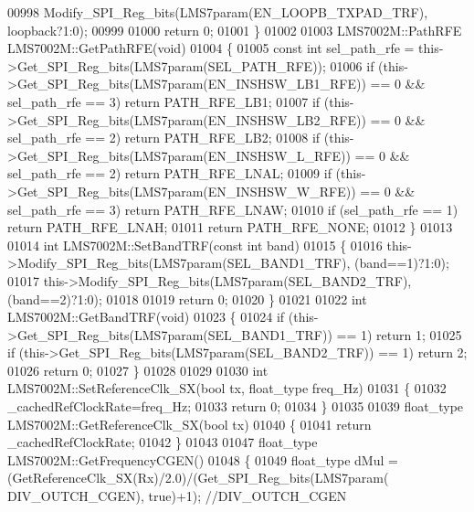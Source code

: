 \begin{DoxyCode}
{{{{{{{{{{{{{{{{{{{{{{{{{00998     Modify_SPI_Reg_bits(LMS7param(EN_LOOPB_TXPAD_TRF), loopback?1:0);
00999 
01000     \textcolor{keywordflow}{return} 0;
01001 \}
01002 
01003 LMS7002M::PathRFE LMS7002M::GetPathRFE(\textcolor{keywordtype}{void})
01004 \{
01005     \textcolor{keyword}{const} \textcolor{keywordtype}{int} sel\_path\_rfe = this->Get_SPI_Reg_bits(LMS7param(SEL_PATH_RFE));
01006     \textcolor{keywordflow}{if} (this->Get_SPI_Reg_bits(LMS7param(EN_INSHSW_LB1_RFE)) == 0 && sel\_path\_rfe == 3) \textcolor{keywordflow}{return} 
      PATH_RFE_LB1;
01007     \textcolor{keywordflow}{if} (this->Get_SPI_Reg_bits(LMS7param(EN_INSHSW_LB2_RFE)) == 0 && sel\_path\_rfe == 2) \textcolor{keywordflow}{return} 
      PATH_RFE_LB2;
01008     \textcolor{keywordflow}{if} (this->Get_SPI_Reg_bits(LMS7param(EN_INSHSW_L_RFE)) == 0 && sel\_path\_rfe == 2) \textcolor{keywordflow}{return} 
      PATH_RFE_LNAL;
01009     \textcolor{keywordflow}{if} (this->Get_SPI_Reg_bits(LMS7param(EN_INSHSW_W_RFE)) == 0 && sel\_path\_rfe == 3) \textcolor{keywordflow}{return} 
      PATH_RFE_LNAW;
01010     \textcolor{keywordflow}{if} (sel\_path\_rfe == 1) \textcolor{keywordflow}{return} PATH_RFE_LNAH;
01011     \textcolor{keywordflow}{return} PATH_RFE_NONE;
01012 \}
01013 
01014 \textcolor{keywordtype}{int} LMS7002M::SetBandTRF(\textcolor{keyword}{const} \textcolor{keywordtype}{int} band)
01015 \{
01016     this->Modify_SPI_Reg_bits(LMS7param(SEL_BAND1_TRF), (band==1)?1:0);
01017     this->Modify_SPI_Reg_bits(LMS7param(SEL_BAND2_TRF), (band==2)?1:0);
01018 
01019     \textcolor{keywordflow}{return} 0;
01020 \}
01021 
01022 \textcolor{keywordtype}{int} LMS7002M::GetBandTRF(\textcolor{keywordtype}{void})
01023 \{
01024     \textcolor{keywordflow}{if} (this->Get_SPI_Reg_bits(LMS7param(SEL_BAND1_TRF)) == 1) \textcolor{keywordflow}{return} 1;
01025     \textcolor{keywordflow}{if} (this->Get_SPI_Reg_bits(LMS7param(SEL_BAND2_TRF)) == 1) \textcolor{keywordflow}{return} 2;
01026     \textcolor{keywordflow}{return} 0;
01027 \}
01028 
01029 
01030 \textcolor{keywordtype}{int} LMS7002M::SetReferenceClk_SX(\textcolor{keywordtype}{bool} tx, float_type freq\_Hz)
01031 \{
01032     _cachedRefClockRate=freq\_Hz;
01033     \textcolor{keywordflow}{return} 0;
01034 \}
01035 
01039 float_type LMS7002M::GetReferenceClk_SX(\textcolor{keywordtype}{bool} tx)
01040 \{
01041     \textcolor{keywordflow}{return} _cachedRefClockRate;
01042 \}
01043 
01047 float_type LMS7002M::GetFrequencyCGEN()
01048 \{
01049     float_type dMul = (GetReferenceClk_SX(Rx)/2.0)/(Get_SPI_Reg_bits(LMS7param(
      DIV_OUTCH_CGEN), \textcolor{keyword}{true})+1); \textcolor{comment}{//DIV\_OUTCH\_CGEN}
}}}}}}}}}}}}}}}}}}}}}}}}}
\end{DoxyCode}

